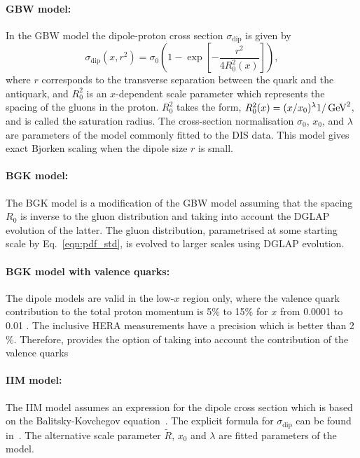 \paragraph{GBW model:} \rm
In the GBW model the dipole-proton cross section $\sigma_{\text{dip}}$ is given by
\begin{equation}
\label{eGBW}
   \sigma_{\text{dip}}(x,r^{2}) = \sigma_{0} \left(1 - \exp \left[-\frac{r^{2}}{4R_{0}^{2}(x)} \right]\right),
\end{equation}
where $r$ corresponds to the transverse separation between the quark and the antiquark, and $R_{0}^{2}$
 is an $x$-dependent scale parameter which represents the spacing of the gluons in the proton. 
$R_{0}^{2}$ takes the form, $R_0^2(x) = (x/x_0)^\lambda  1/ {\rm \,\text{Ge\hspace{-.08em}V}}^{2}$, and is called the saturation radius.
The cross-section normalisation $\sigma_0$, $x_0$, and $\lambda$ are parameters 
of the model commonly fitted to the DIS data.
This model gives exact Bjorken scaling when the dipole size $r$ is small.
 
\paragraph{BGK model:} \rm
The BGK model is a modification of the GBW model assuming that the
spacing $R_0$ is inverse to the gluon distribution and taking
into account the DGLAP evolution of the latter.
The gluon distribution, parametrised at some starting scale by Eq.~\ref{eqn:pdf_std}, 
is evolved to larger scales using DGLAP evolution.

\paragraph{BGK model with valence quarks:} \rm
The dipole models are valid in the low-$x$ region only, where the valence quark contribution to the total proton momentum 
is 5\% to 15\% for $x$ from 0.0001 to 0.01 \cite{Collaboration:2010ry}.
The inclusive HERA measurements have a precision which is better than 2$\%$. 
Therefore, \fitter provides the option of taking into account the contribution of the valence quarks
%

\paragraph{IIM model:} \rm
The IIM model assumes an expression for the dipole cross section which is based on the 
Balitsky-Kovchegov equation~\cite{Balitsky:1995ub}. The explicit formula for $\sigma_{\text{dip}}$ 
can be found in~\cite{Iancu:2003ge}. 
The alternative scale parameter $\tilde{R}$, $x_{0}$ and $\lambda$ are fitted parameters of the model.

